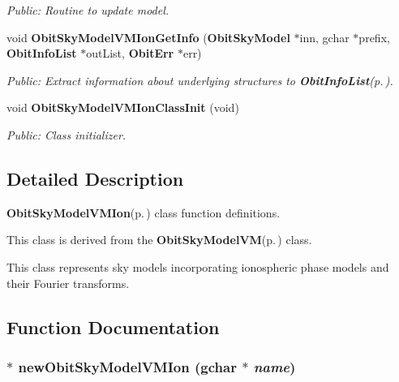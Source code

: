 \begin{CompactItemize}
\begin{CompactList}\small\item\em Public: Routine to update model. \item\end{CompactList}\item 
void {\bf Obit\-Sky\-Model\-VMIon\-Get\-Info} ({\bf Obit\-Sky\-Model} $\ast$inn, gchar $\ast$prefix, {\bf Obit\-Info\-List} $\ast$out\-List, {\bf Obit\-Err} $\ast$err)
\begin{CompactList}\small\item\em Public: Extract information about underlying structures to {\bf Obit\-Info\-List}{\rm (p.\,\pageref{structObitInfoList})}. \item\end{CompactList}\item 
void {\bf Obit\-Sky\-Model\-VMIon\-Class\-Init} (void)
\begin{CompactList}\small\item\em Public: Class initializer. \item\end{CompactList}\end{CompactItemize}


\subsection{Detailed Description}
{\bf Obit\-Sky\-Model\-VMIon}{\rm (p.\,\pageref{structObitSkyModelVMIon})} class function definitions. 

This class is derived from the {\bf Obit\-Sky\-Model\-VM}{\rm (p.\,\pageref{structObitSkyModelVM})} class.

This class represents sky models incorporating ionospheric phase models and their Fourier transforms.

\subsection{Function Documentation}
\subsubsection{$\ast$ new\-Obit\-Sky\-Model\-VMIon (gchar $\ast$ {\em name})}\label{ObitSkyModelVMIon_8c_a7}



